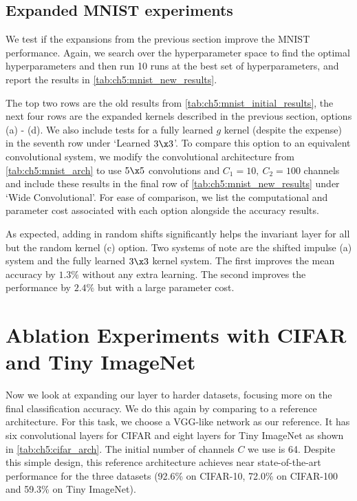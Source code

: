 \subsection{Expanded MNIST experiments}
We test if the expansions from the previous section improve the MNIST
performance. Again, we search over the hyperparameter space to find the optimal
hyperparameters and then run 10 runs at the best set of hyperparameters, and
report the results in \autoref{tab:ch5:mnist_new_results}. 

The top two rows are the old results from
\autoref{tab:ch5:mnist_initial_results}, the next four rows are the expanded
kernels described in the previous section, options (a) - (d). We also include
tests for a fully learned $g$ kernel (despite the expense) in the seventh row
under `Learned $3\x 3$'. To compare this option to an equivalent convolutional
system, we modify the convolutional architecture from
\autoref{tab:ch5:mnist_arch} to use $5\x 5$ convolutions and $C_1 = 10,\ C_2 =
100$ channels and include these results in the final row of
\autoref{tab:ch5:mnist_new_results} under `Wide Convolutional'. For ease of
comparison, we list the computational and parameter cost associated with each
option alongside the accuracy results.

As expected, adding in random shifts significantly helps the invariant layer for all 
but the random kernel (c) option. Two systems of
note are the shifted impulse (a) system and the fully learned $3\x 3$ kernel
system. The first improves the mean accuracy by $1.3\%$ without any extra
learning. The second improves the performance by $2.4\%$ but with a large
parameter cost. 



\section{Ablation Experiments with CIFAR and Tiny ImageNet}\label{sec:ch5:conv_exp}

Now we look at expanding our layer to harder datasets, focusing more on the
final classification accuracy. We do this again by comparing to a reference
architecture. For this task, we choose a VGG-like network as our reference.
It has six convolutional layers for CIFAR and eight layers for Tiny ImageNet as shown in
\autoref{tab:ch5:cifar_arch}. The initial number of channels $C$ we use is 64. Despite
this simple design, this reference architecture achieves near state-of-the-art performance
for the three datasets (92.6\% on CIFAR-10, 72.0\% on CIFAR-100 and 59.3\% on
Tiny ImageNet).

